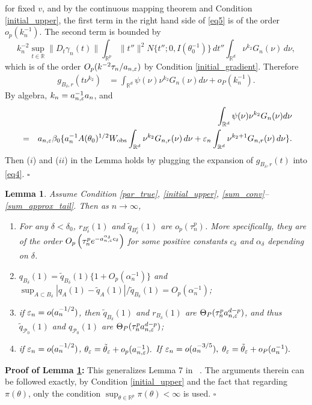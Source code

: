 \documentclass{article}
\newtheorem{lemma}{Lemma}
\begin{document}
	for fixed $v$, and by the continuous mapping theorem and Condition \ref{initial_upper}, the
	first term in the right hand side of \eqref{eq5} is of the order
	$o_{p}(k_{n}^{-1})$. The second term is bounded by 
	\[
	k_{n}^{-2}\sup_{t\in\mathbb{R}}\|D_{t}\gamma_{n}(t)\|\int_{\mathbb{R}^{p}}\|t''\|^{2}N\{t'';0,I(\theta_{0}^{-1})\}\,dt''\int_{\mathbb{R}^{d}}\nu^{k_{2}}G_{n}(\nu)\,d\nu,
	\]
	which is of the order $O_{p}(k^{-2}\tau_{n}/a_{n,\varepsilon})$ by Condition \ref{initial_gradient}.
	Therefore 
	\begin{align}
	g_{B_{\delta},r}(t\nu^{k_{2}}) & =\int_{\mathbb{R}^{d}}\psi(\nu)\nu^{k_{2}}G_{n}(\nu)d\nu+o_{P}(k_{n}^{-1}).\label{eq6}
	\end{align}
	By algebra, $k_{n}=a_{n,\varepsilon}^{-1}a_{n}$, and 
	\begin{eqnarray}
	&  & \int_{\mathbb{R}^{d}}\psi(\nu)\nu^{k_{2}}G_{n}(\nu)d\nu\nonumber \\
	& = & a_{n,\varepsilon}\beta_{0}\{a_{n}^{-1}A(\theta_{0})^{1/2}W_{\rm obs}\int_{\mathbb{R}^{d}}\nu^{k_{2}}G_{n,r}(\nu)\,d\nu+\varepsilon_{n}\int_{\mathbb{R}^{d}}\nu^{k_{2}+1}G_{n,r}(\nu)\,d\nu\}.\label{eq7}
	\end{eqnarray}
	Then ($i$) and ($ii$) in the Lemma holds by plugging the expansion
	of $g_{B_{\delta},r}(t)$ into \eqref{eq4}.
	\hfill{$\square$} 
	
\pagebreak 
\begin{lemma}\label{Alemma3.5} Assume Condition \ref{par_true}, \ref{initial_upper}, \ref{sum_conv}--\ref{sum_approx_tail}. Then as $n\rightarrow\infty$, 
	\begin{enumerate}
		\item[(i)] For any $\delta<\delta_{0}$, $r_{B_{\delta}^{c}}(1)$ and $\tilde{q}_{B_{\delta}^{c}}(1)$
		are $o_{p}(\tau_{n}^{p})$. More specifically, they are of the order
		$O_{p}\left(\tau_{n}^{p}e^{-a_{n,\varepsilon}^{\alpha_{\delta}}c_{\delta}}\right)$
		for some positive constants $c_{\delta}$ and $\alpha_{\delta}$ depending
		on $\delta$.
		\item[(ii)] $q_{B_{\delta}}(1)=\tilde{q}_{B_{\delta}}(1)\{1+O_{p}(\alpha_{n}^{-1})\}$
		and $\sup_{A\subset B_{\delta}}|q_{A}(1)-\tilde{q}_{A}(1)|/\tilde{q}_{B_{\delta}}(1)=O_{p}(\alpha_{n}^{-1})$; 
		\item[(iii)] if $\varepsilon_{n}=o(a_{n}^{-1/2})$, then $\tilde{q}_{B_{\delta}}(1)$ and
		$r_{B_{\delta}}(1)$ are $\Theta_{P}(\tau_{n}^{p}a_{n,\varepsilon}^{d-p})$,
		and thus $\tilde{q}_{\mathcal{P}_{0}}(1)$ and $q_{\mathcal{P}_{0}}(1)$
		are $\Theta_{P}(\tau_{n}^{p}a_{n,\varepsilon}^{d-p})$; 
		\item[(iv)] if $\varepsilon_{n}=o(a_{n}^{-1/2})$, $\theta_{\varepsilon}=\tilde{\theta}_{\varepsilon}+o_{p}(a_{n,\varepsilon}^{-1}).$
		If $\varepsilon_{n}=o(a_{n}^{-3/5}),$ $\theta_{\varepsilon}=\tilde{\theta}_{\varepsilon}+o_{P}(a_{n}^{-1}).$
	\end{enumerate} \end{lemma}
{\bf Proof of Lemma \ref{Alemma3.5}:} 
	This generalizes Lemma 7 in ~\cite{Li2017}. The arguments therein
	can be followed exactly, by Condition \ref{initial_upper} and the fact that regarding $\pi(\theta)$,
	only the condition $\sup_{\theta\in\mathbb{R}^{p}}\pi(\theta)<\infty$
	is used.
	\hfill{$\square$} 
	
\end{document}
